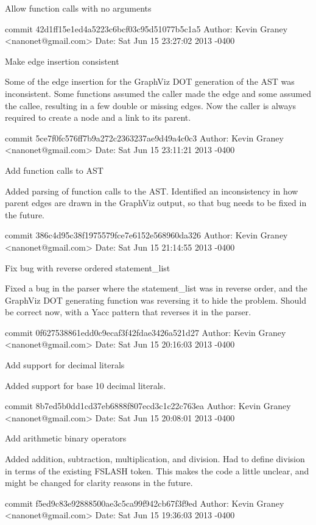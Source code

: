     Allow function calls with no arguments

commit 42d1ff15e1ed4a5223c6bcf03c95d51077b5c1a5
Author: Kevin Graney <nanonet@gmail.com>
Date:   Sat Jun 15 23:27:02 2013 -0400

    Make edge insertion consistent
    
    Some of the edge insertion for the GraphViz DOT generation of the
    AST was inconsistent.  Some functions assumed the caller made the
    edge and some assumed the callee, resulting in a few double or
    missing edges.  Now the caller is always required to create a
    node and a link to its parent.

commit 5ce7f0fc576ff7b9a272c2363237ae9d49a4c0c3
Author: Kevin Graney <nanonet@gmail.com>
Date:   Sat Jun 15 23:11:21 2013 -0400

    Add function calls to AST
    
    Added parsing of function calls to the AST.  Identified an
    inconsistency in how parent edges are drawn in the GraphViz output,
    so that bug needs to be fixed in the future.

commit 386c4d95c38f1975579fce7e6152e568960da326
Author: Kevin Graney <nanonet@gmail.com>
Date:   Sat Jun 15 21:14:55 2013 -0400

    Fix bug with reverse ordered statement_list
    
    Fixed a bug in the parser where the statement_list was in reverse
    order, and the GraphViz DOT generating function was reversing it
    to hide the problem.  Should be correct now, with a Yacc pattern
    that reverses it in the parser.

commit 0f627538861edd0c9ecaf3f42fdae3426a521d27
Author: Kevin Graney <nanonet@gmail.com>
Date:   Sat Jun 15 20:16:03 2013 -0400

    Add support for decimal literals
    
    Added support for base 10 decimal literals.

commit 8b7ed5b0dd1cd37eb6888f807ecd3c1c22c763ea
Author: Kevin Graney <nanonet@gmail.com>
Date:   Sat Jun 15 20:08:01 2013 -0400

    Add arithmetic binary operators
    
    Added addition, subtraction, multiplication, and division.  Had to
    define division in terms of the existing FSLASH token.  This makes
    the code a little unclear, and might be changed for clarity
    reasons in the future.

commit f5ed9c83e92888500ae3c5ca99f942cb67f3f9ed
Author: Kevin Graney <nanonet@gmail.com>
Date:   Sat Jun 15 19:36:03 2013 -0400

